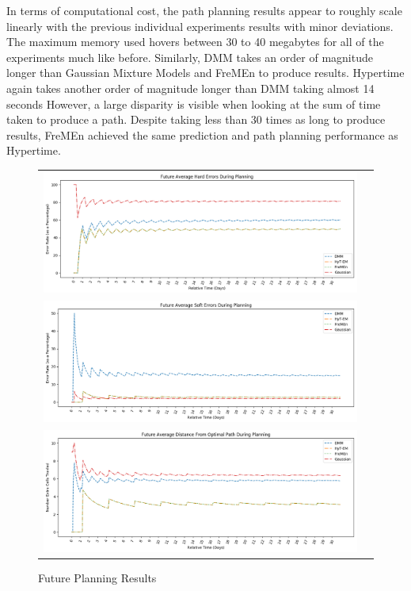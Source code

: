In terms of computational cost, the path planning results appear to roughly
scale linearly with the previous individual experiments results with minor
deviations. The maximum memory used hovers between 30 to 40 megabytes for all
of the experiments much like before. Similarly, DMM takes an order of
magnitude longer than Gaussian Mixture Models and FreMEn to produce results.
Hypertime again takes another order of magnitude longer than DMM taking
almost 14 seconds However, a large disparity is visible when looking at the
sum of time taken to produce a path. Despite taking less than 30 times as long
to produce results, FreMEn achieved the same prediction and path planning
performance as Hypertime.


\begin{center}
  \begin{figure}[!Hp]
  \begin{tabular}{cc}
    {\includegraphics[width = 6in]{images/results/Future_Average_Hard_Errors_During_Planning.png}} \\
    {\includegraphics[width = 6in]{images/results/Future_Average_Soft_Errors_During_Planning.png}} \\
    {\includegraphics[width = 6in]{images/results/Future_Average_Distance_From_Optimal_Path_During_Planning.png}} \\
  \end{tabular}
  \caption{ Future Planning Results}
  \label{fig:G_FP_res}
\end{figure}
\end{center}



